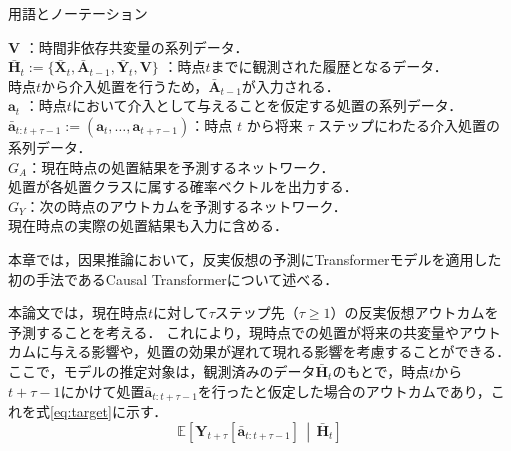 \documentclass[dvipdfmx]{jreport}
\begin{document}
\begin{itembox}[l]{\large{用語とノーテーション}}
\begin{tabbing}
        \hspace{15pt} \raisebox{0.5ex}{\tiny $\bullet$} $\mathbf{V}$ \>：時間非依存共変量の系列データ．\\[0.5em]
        \hspace{15pt} \raisebox{0.5ex}{\tiny $\bullet$} $\bar{\mathbf{H}}_t := \{\bar{\mathbf{X}}_t, \bar{\mathbf{A}}_{t-1}, \bar{\mathbf{Y}}_t, \mathbf{V}\}$ \>：時点$t$までに観測された履歴となるデータ．\\[0.5em]\>\hspace{6.5pt}時点$t$から介入処置を行うため，$\bar{\mathbf{A}}_{t-1}$が入力される．\\[0.5em]
        \hspace{15pt} \raisebox{0.5ex}{\tiny $\bullet$} $\mathbf{a}_t$ \>：時点$t$において介入として与えることを仮定する処置の系列データ． \\[0.5em]
        \hspace{15pt} \raisebox{0.5ex}{\tiny $\bullet$} $\bar{\mathbf{a}}_{t:t+\tau-1} := (\mathbf{a}_t,\dots, \mathbf{a}_{t+\tau-1})$\>：時点 $t$ から将来 $\tau$ ステップにわたる介入処置の系列データ．\\[0.5em]
        \hspace{15pt} \raisebox{0.5ex}{\tiny $\bullet$} $G_A$\>：現在時点の処置結果を予測するネットワーク．\\[0.5em]\>\hspace{6.5pt}処置が各処置クラスに属する確率ベクトルを出力する．\\[0.5em]
        \hspace{15pt} \raisebox{0.5ex}{\tiny $\bullet$} $G_Y$\>：次の時点のアウトカムを予測するネットワーク．\\[0.5em]\>\hspace{6.5pt}現在時点の実際の処置結果も入力に含める．
    \end{tabbing}
\end{itembox}

本章では，因果推論において，反実仮想の予測にTransformerモデルを適用した初の手法であるCausal Transformerについて述べる．

本論文では，現在時点$t$に対して$\tau$ステップ先（$\tau \geq 1$）の反実仮想アウトカムを予測することを考える．
これにより，現時点での処置が将来の共変量やアウトカムに与える影響や，処置の効果が遅れて現れる影響を考慮することができる．
ここで，モデルの推定対象は，観測済みのデータ$\bar{\mathbf{H}}_t$のもとで，時点$t$から$t+\tau-1$にかけて処置$\bar{\mathbf{a}}_{t:t+\tau-1}$を行ったと仮定した場合のアウトカムであり，これを式\eqref{eq:target}に示す．
\begin{equation}
    \mathbb{E}\left[ \mathbf{Y}_{t+\tau} \left[ \bar{\mathbf{a}}_{t:t+\tau-1} \right] \,\middle|\, \bar{\mathbf{H}}_t \right] \label{eq:target}
\end{equation}
\end{document}
